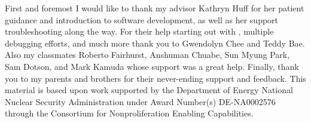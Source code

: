 First and foremost I would like to thank my advisor Kathryn Huff for her patient guidance
and introduction to software development, as well as her support troubleshooting along the
way. For their help starting out with \Cyclus, multiple debugging efforts, and much more thank you
to Gwendolyn Chee and Teddy Bae. Also my classmates Roberto Fairhurst, Anshuman Chuabe, Sun Myung Park, Sam Dotson, and Mark Kamuda whose support was a great help. Finally, thank you to my parents and brothers
for their never-ending support and feedback. This material is based upon work supported by the Department of Energy National
Nuclear Security Administration under Award Number(s) DE-NA0002576 through
the Consortium for Nonproliferation Enabling Capabilities.